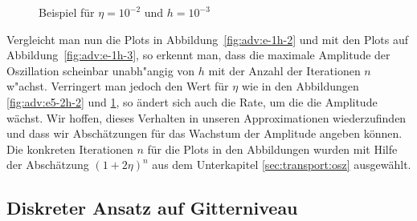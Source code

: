 \begin{figure}
\centering
{}
\caption{Beispiel für $\eta = 10^{-2}$ und $h=10^{-3}$}
\label{fig:adv:e5-2h-3}
\end{figure}

Vergleicht man nun die Plots in Abbildung~\ref{fig:adv:e-1h-2} und mit den Plots auf Abbildung~\ref{fig:adv:e-1h-3}, so erkennt man, dass die maximale Amplitude der Oszillation scheinbar unabh"angig von $h$ mit der Anzahl der Iterationen $n$ w"achst.
Verringert man jedoch den Wert für $\eta$ wie in den Abbildungen \ref{fig:adv:e5-2h-2} und \ref{fig:adv:e5-2h-3}, so ändert sich auch die Rate, um die die Amplitude wächst.
Wir hoffen, dieses Verhalten in unseren Approximationen wiederzufinden und dass wir Abschätzungen für das Wachstum der Amplitude angeben können.
Die konkreten Iterationen $n$ für die Plots in den Abbildungen wurden mit Hilfe der Abschätzung $(1 + 2 \eta)^n$ aus dem Unterkapitel \ref{sec:transport:osz} ausgewählt.



\subsection {Diskreter Ansatz auf Gitterniveau} \label{sec:transport:diskret}

